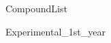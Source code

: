 \documentclass[10pt,a4paper]{article}
\begin{document}
	

{CompoundList}

\tableofcontents




{Experimental_1st_year}

%
\end{document}
